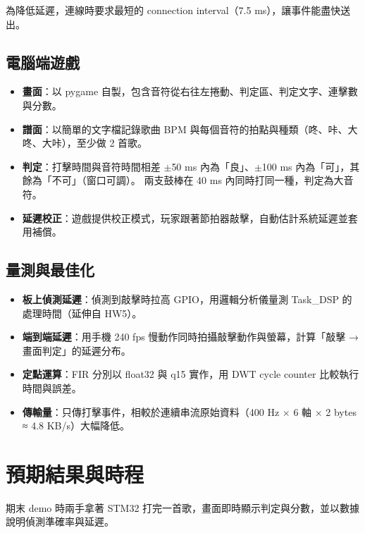 \documentclass[12pt]{extarticle}
\begin{document}
為降低延遲，連線時要求最短的 connection interval（7.5 ms），讓事件能盡快送出。

\subsection{電腦端遊戲}
\begin{itemize}
  \item \textbf{畫面}：以 pygame 自製，包含音符從右往左捲動、判定區、判定文字、連擊數與分數。
  \item \textbf{譜面}：以簡單的文字檔記錄歌曲 BPM 與每個音符的拍點與種類（咚、咔、大咚、大咔），至少做 2 首歌。
  \item \textbf{判定}：打擊時間與音符時間相差 $\pm$50 ms 內為「良」、$\pm$100 ms 內為「可」，其餘為「不可」（窗口可調）。
        兩支鼓棒在 40 ms 內同時打同一種，判定為大音符。
  \item \textbf{延遲校正}：遊戲提供校正模式，玩家跟著節拍器敲擊，自動估計系統延遲並套用補償。
\end{itemize}

\subsection{量測與最佳化}
\begin{itemize}
  \item \textbf{板上偵測延遲}：偵測到敲擊時拉高 GPIO，用邏輯分析儀量測 Task\_DSP 的處理時間（延伸自 HW5）。
  \item \textbf{端到端延遲}：用手機 240 fps 慢動作同時拍攝敲擊動作與螢幕，計算「敲擊 → 畫面判定」的延遲分布。
  \item \textbf{定點運算}：FIR 分別以 float32 與 q15 實作，用 DWT cycle counter 比較執行時間與誤差。
  \item \textbf{傳輸量}：只傳打擊事件，相較於連續串流原始資料（400 Hz × 6 軸 × 2 bytes ≈ 4.8 KB/s）大幅降低。
\end{itemize}

\section{預期結果與時程}

期末 demo 時兩手拿著 STM32 打完一首歌，畫面即時顯示判定與分數，並以數據說明偵測準確率與延遲。

\end{document}
